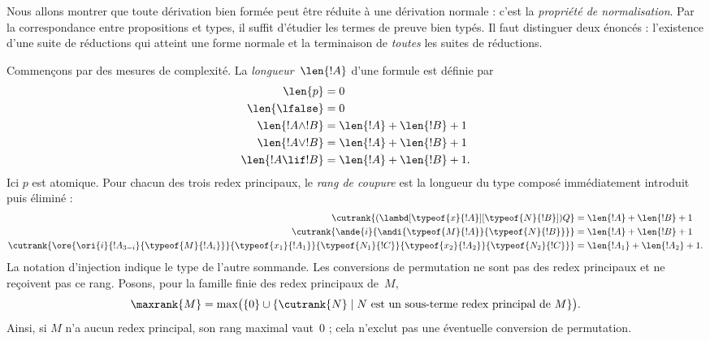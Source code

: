 \documentclass[../../../include/open-logic-section]{subfiles}
\begin{document}


Nous allons montrer que toute dérivation bien formée
peut être réduite à une dérivation normale : c'est la
\emph{propriété de normalisation}. Par la correspondance
entre propositions et types, il suffit d'étudier les
termes de preuve bien typés. Il faut distinguer deux
énoncés : l'existence d'une suite de réductions qui
atteint une forme normale et la terminaison de
\emph{toutes} les suites de réductions.

Commençons par des mesures de complexité. La
\emph{longueur}~$\len{!A}$ d'une formule est définie par
\begin{align*}
  \len{p} &= 0\\
  \len{\lfalse} &= 0\\
  \len{!A \land !B} &= \len{!A} + \len{!B} + 1\\
  \len{!A \lor !B} &= \len{!A} + \len{!B} + 1 \\
  \len{!A \lif !B} &= \len{!A} + \len{!B} + 1.
\end{align*}
Ici $p$ est atomique. Pour chacun des trois redex
principaux, le \emph{rang de coupure} est la longueur du
type composé immédiatement introduit puis éliminé :
\begin{align*}
  \cutrank{(\lambd[\typeof{x}{!A}][\typeof{N}{!B}])Q} &=
  \len{!A} + \len{!B} + 1 \\
  \cutrank{\ande{i}{\andi{\typeof{M}{!A}}{\typeof{N}{!B}}}} &=
  \len{!A} + \len{!B} + 1 \\
  \cutrank{\ore{\ori{i}{!A_{3-i}}{\typeof{M}{!A_i}}}
    {\typeof{x_1}{!A_1}}{\typeof{N_1}{!C}}
    {\typeof{x_2}{!A_2}}{\typeof{N_2}{!C}}} &=
  \len{!A_1} + \len{!A_2} + 1.
\end{align*}
La notation d'injection indique le type de l'autre
sommande. Les conversions de permutation ne sont pas
des redex principaux et ne reçoivent pas ce rang.
Posons, pour la famille finie des redex principaux de~$M$,
\[
  \maxrank{M} =
  \max\bigl(\{0\}\cup
    \{\cutrank{N}\mid N\text{ est un sous-terme redex principal de }M\}
  \bigr).
\]
Ainsi, si $M$ n'a aucun redex principal, son rang maximal
vaut~$0$ ; cela n'exclut pas une éventuelle conversion
de permutation.
\end{document}
